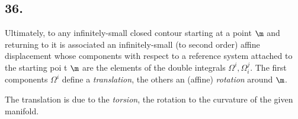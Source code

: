 \subsection*{36.}

Ultimately, to any infinitely-small closed contour starting at a point $\m$ and returning to it is associated an infinitely-small (to second order) affine displacement  whose components with respect to a reference system attached to the starting poi t $\m$ are the elements of the double integrals $\Omega^i, \Omega_i^j$. The first components $\Omega^i$ define a \textit{translation}, the others an (affine) \textit{rotation} around $\m$.

The translation is due to the \textit{torsion}, the rotation to the curvature of the given manifold.